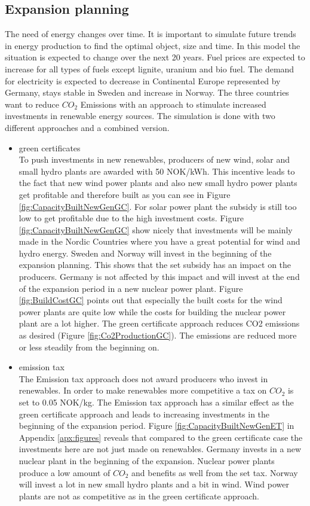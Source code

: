 \documentclass{article}
\begin{document}
\subsection{Expansion planning}
The need of energy changes over time. It is important to simulate future trends in energy production to find the optimal object, size and time. In this model the situation is expected to change over the next 20 years. Fuel prices are expected to increase for all types of fuels except lignite, uranium and bio fuel. The demand for electricity is expected to decrease in Continental Europe represented by Germany, stays stable in Sweden and increase in Norway. The three countries want to reduce $CO_2$ Emissions with an approach to stimulate increased investments in renewable energy sources. The simulation is done with two different approaches and a combined version.
\begin{itemize}
\item green certificates\\
To push investments in new renewables, producers of new wind, solar and small hydro plants are awarded with 50 NOK/kWh. This incentive leads to the fact that new wind power plants and also new small hydro power plants get profitable and therefore built as you can see in Figure \ref{fig:CapacityBuiltNewGenGC}. For solar power plant the subsidy is still too low to get profitable due to the high investment costs. Figure \ref{fig:CapacityBuiltNewGenGC} show nicely that investments will be mainly made in the Nordic Countries where you have a great potential for wind and hydro energy. Sweden and Norway will invest in the beginning of the expansion planning. This shows that the set subsidy has an impact on the producers. Germany is not affected by this impact and will invest at the end of the expansion period in a new nuclear power plant. Figure \ref{fig:BuildCostGC} points out that especially the built costs for the wind power plants are quite low while the costs for building the nuclear power plant are a lot higher. The green certificate approach reduces CO2 emissions as desired (Figure \ref{fig:Co2ProductionGC}). The emissions are reduced more or less steadily from the beginning on.
\item emission tax\\
The Emission tax approach does not award producers who invest in renewables. In order to make renewables more competitive a tax on $CO_2$ is set to 0.05 NOK/kg.  The Emission tax approach has a similar effect as the green certificate approach and leads to increasing investments in the beginning of the expansion period. Figure \ref{fig:CapacityBuiltNewGenET} in Appendix \ref{apx:figures} reveals that compared to the green certificate case the investments here are not just made on renewables. Germany invests in a new nuclear plant in the beginning of the expansion. Nuclear power plants produce a low amount of $CO_2$ and benefits as well from the set tax. Norway will invest a lot in new small hydro plants and a bit in wind. Wind power plants are not as competitive as in the green certificate approach.\\

\end{itemize}
\end{document}
